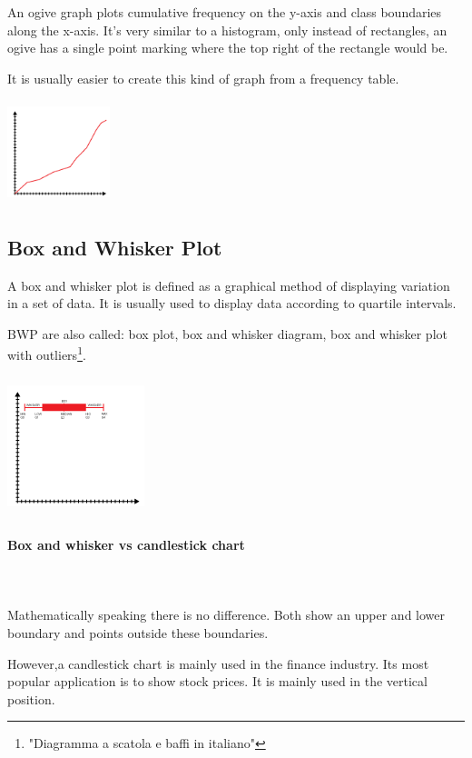 \documentclass{article}
\begin{document}
An ogive graph plots cumulative frequency on the y-axis and class boundaries along the x-axis. It’s very similar to a histogram, only instead of rectangles, an ogive has a single point marking where the top right of the rectangle would be. 

It is usually easier to create this kind of graph from a frequency table.

\includegraphics[width=3cm, height=3cm]{ogive_chart}

\subsection{Box and Whisker Plot}
A box and whisker plot is defined as a graphical method of displaying variation in a set of data. It is usually used to display data according to quartile intervals.

BWP are also called: box plot, box and whisker diagram, box and whisker plot with outliers\footnote{"Diagramma a scatola e baffi in italiano"}.

\includegraphics[width=4cm, height=4cm]{box_whisker_chart}

\paragraph{Box and whisker vs candlestick chart}\mbox{} \\
\mbox{} \\
Mathematically speaking there is no difference. Both show an upper and lower boundary and points outside these boundaries. 

However,a candlestick chart is mainly used in the finance industry. Its most popular application is to show stock prices. It is mainly used in the vertical position.
\end{document}
